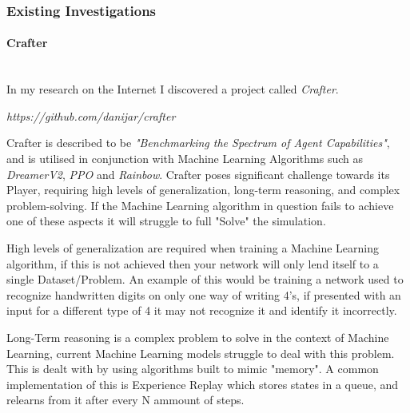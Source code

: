 \begin{flushleft}
            \subsubsection{Existing Investigations} 
                \paragraph{Crafter} \mbox{} \\
                    \vspace{0.2cm}
                        In my research on the Internet I discovered a project called \textit{Crafter}. \\

                        \vspace{0.2cm}
                        \centerline{\textit{https://github.com/danijar/crafter}}
                        \vspace{0.2cm}

                        Crafter is described to be \textit{"Benchmarking the Spectrum of Agent Capabilities"}, and is utilised
                        in conjunction with Machine Learning Algorithms such as \textit{DreamerV2}, \textit{PPO} and \textit{Rainbow}. Crafter poses significant
                        challenge towards its Player, requiring high levels of generalization, long-term reasoning, and complex 
                        problem-solving. If the Machine Learning algorithm in question fails to achieve one of these aspects it will 
                        struggle to full "Solve" the simulation. \\

                        \vspace{0.2cm}

                        High levels of generalization are required when training a Machine Learning algorithm, if this is not achieved then
                        your network will only lend itself to a single Dataset/Problem. An example of this would be training a network used
                        to recognize handwritten digits on only one way of writing 4's, if presented with an input for a different type of 
                        4 it may not recognize it and identify it incorrectly. \\
                        
                        \vspace{0.2cm}

                        Long-Term reasoning is a complex problem to solve in the context of Machine Learning, current Machine Learning models
                        struggle to deal with this problem. This is dealt with by using algorithms built to mimic "memory". A common 
                        implementation of this is Experience Replay which stores states in a queue, and relearns from it after every N ammount
                        of steps. \\


\end{flushleft}
